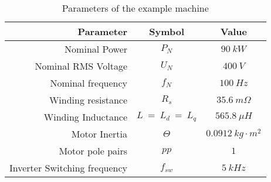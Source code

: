 \begin{table}[htb]
\caption{Parameters of the example machine}
\begin{center}
\begin{tabular}{|r|c|c|}
\hline
\textbf{Parameter} & \textbf{Symbol} & \textbf{Value} \\
\hline
Nominal Power & $P_N$ & $90\ kW$ \\
\hline
Nominal RMS Voltage & $U_N$ & $400\ V$ \\
\hline
Nominal frequency & $f_N$ & $100\ Hz$ \\
\hline
Winding resistance & $R_s$ & $35.6\ m\Omega$ \\
\hline
Winding Inductance & $L\ =\ L_d\ =\ L_q$& $565.8\  \mu{}H$ \\
\hline
Motor Inertia & $\Theta$ & $0.0912\  kg\cdot{}m^2$ \\
\hline
Motor pole pairs & $pp$ & $1$ \\
\hline
Inverter Switching frequency & $f_{sw}$ & $5\ kHz$ \\
\hline
\end{tabular}
\end{center}
\label{tab:machine}
\end{table}
